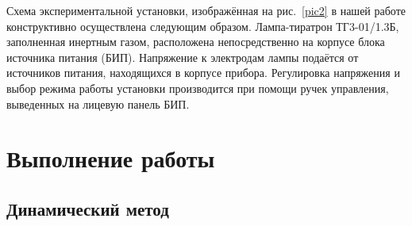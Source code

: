 \documentclass[a4paper,12pt]{article} %
\begin{document}
	Схема экспериментальной установки, изображённая на рис.~\ref{pic2} в нашей работе конструктивно осуществлена следующим образом. Лампа-тиратрон ТГ3-01/1.3Б, заполненная инертным газом, расположена непосредственно на корпусе блока источника питания (БИП). Напряжение к электродам лампы подаётся от источников питания, находящихся в корпусе прибора. Регулировка напряжения и выбор режима работы установки производится при помощи ручек управления, выведенных на лицевую панель БИП.
	
\section{Выполнение работы}

\subsection{Динамический метод}
\end{document}
